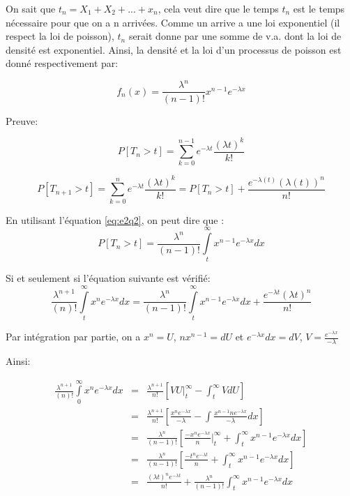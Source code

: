 \documentclass[a4paper]{article}
\begin{document}
On sait que $t_n= X_1 + X_2+ ...+ x_n$, cela veut dire que le temps $t_n$ est le
temps nécessaire pour que on a n arrivées. Comme un arrive a une loi exponentiel
(il respect la loi de poisson), $t_n$ serait donne par une somme de v.a. dont la
loi de  densité est exponentiel. Ainsi, la  densité et la loi  d'un processus de
poisson est donné respectivement par:

\begin{equation}
f_n(x)=\frac{\lambda^{n}}{(n-1)!}x^{n-1}e^{-\lambda x}
\end{equation}

Preuve:


\begin{equation} 
P[T_n > t] = \sum_{k=0}^{n-1}e^{-\lambda t}\frac{(\lambda t)^k}{k!}
\end{equation}

\begin{equation}\label{eq:e2q2}
P[T_{n+1} >  t] = \sum_{k=0}^{n}e^{-\lambda t}\frac{(\lambda  t)^k}{k!}= P[T_n >
t]+ \frac{e^{-\lambda (t)}(\lambda (t))^n}{n!}
\end{equation}

En utilisant l'équation \ref{eq:e2q2}, on peut dire que :
\begin{equation} 
P[T_n  > t] =  \frac{\lambda^{n}}{(n-1)!}\int\limits_t^\infty x^{n-1}e^{-\lambda
  x}dx
\end{equation}

Si et seulement si l'équation suivante est vérifié:
\begin{equation} 
\frac{\lambda^{n+1}}{(n)!}\int\limits_t^\infty x^{n}e^{-\lambda
  x}dx = \frac{\lambda^{n}}{(n-1)!}\int\limits_t^\infty x^{n-1}e^{-\lambda
  x}dx +  \frac{e^{-\lambda t}(\lambda t)^n}{n!}
\end{equation}

Par intégration  par partie,  on a $  x^n =  U$, $nx^{n-1}=dU$ et  $ e^{-\lambda
  x}dx=dV$, $V=\frac{e^{-\lambda x}}{-\lambda}$

Ainsi:


\begin{eqnarray*}
\frac{\lambda^{n+1}}{(n)!}\int\limits_0^\infty x^{n}e^{-\lambda
  x}dx &=& \frac{\lambda^{n+1}}{n!}[VU|_t^\infty - \int_t^\infty VdU] \\
& =&\frac{\lambda^{n+1}}{n!}[\frac{x^n    e^{-\lambda     x}}{-\lambda}    -    \int
\frac{x^{n-1}n e^{-\lambda x}}{-\lambda}dx] \\
& =&  \frac{\lambda^{n}}{(n-1)!}[\frac{-x^n e^{-\lambda x}}{n}|_t^\infty +
\int_t^\infty{x^{n-1} e^{-\lambda x}}dx] \\
& =&  \frac{\lambda^{n}}{(n-1)!}[\frac{-t^n e^{-\lambda t}}{n} +
\int_t^\infty{x^{n-1} e^{-\lambda x}}dx] \\
& =& \frac{(\lambda t)^n e^{-\lambda t}}{n!} +
\frac{\lambda^{n}}{(n-1)!}\int_t^\infty{x^{n-1} e^{-\lambda x}}dx
\end{eqnarray*}
\end{document}
